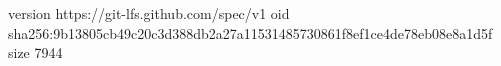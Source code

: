 version https://git-lfs.github.com/spec/v1
oid sha256:9b13805cb49c20c3d388db2a27a11531485730861f8ef1ce4de78eb08e8a1d5f
size 7944
